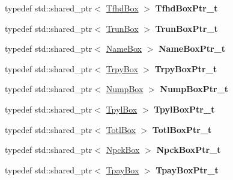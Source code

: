 \begin{DoxyCompactItemize}
typedef std\+::shared\+\_\+ptr$<$ \mbox{\hyperlink{classmp4_parser_1_1_tfhd_box}{Tfhd\+Box}} $>$ {\bfseries Tfhd\+Box\+Ptr\+\_\+t}
\item 
\mbox{\label{namespacemp4_parser_ac970ba7eebced5654f64e1b73e5c2da7}} 
typedef std\+::shared\+\_\+ptr$<$ \mbox{\hyperlink{classmp4_parser_1_1_trun_box}{Trun\+Box}} $>$ {\bfseries Trun\+Box\+Ptr\+\_\+t}
\item 
\mbox{\label{namespacemp4_parser_ab5c488fa3b02c086a34fd59710661f1c}} 
typedef std\+::shared\+\_\+ptr$<$ \mbox{\hyperlink{classmp4_parser_1_1_name_box}{Name\+Box}} $>$ {\bfseries Name\+Box\+Ptr\+\_\+t}
\item 
\mbox{\label{namespacemp4_parser_a4f55dbfb3a7dca7b1593637979e08aea}} 
typedef std\+::shared\+\_\+ptr$<$ \mbox{\hyperlink{classmp4_parser_1_1_trpy_box}{Trpy\+Box}} $>$ {\bfseries Trpy\+Box\+Ptr\+\_\+t}
\item 
\mbox{\label{namespacemp4_parser_ae38e8b576ad12ada8b415eebd74f6580}} 
typedef std\+::shared\+\_\+ptr$<$ \mbox{\hyperlink{classmp4_parser_1_1_nump_box}{Nump\+Box}} $>$ {\bfseries Nump\+Box\+Ptr\+\_\+t}
\item 
\mbox{\label{namespacemp4_parser_a7ceeb29b43ac8d19e5dde9fa599ae821}} 
typedef std\+::shared\+\_\+ptr$<$ \mbox{\hyperlink{classmp4_parser_1_1_tpyl_box}{Tpyl\+Box}} $>$ {\bfseries Tpyl\+Box\+Ptr\+\_\+t}
\item 
\mbox{\label{namespacemp4_parser_a12490480d6e601622c1b98403a94cc55}} 
typedef std\+::shared\+\_\+ptr$<$ \mbox{\hyperlink{classmp4_parser_1_1_totl_box}{Totl\+Box}} $>$ {\bfseries Totl\+Box\+Ptr\+\_\+t}
\item 
\mbox{\label{namespacemp4_parser_a415c9acfc9e3b5e66fbe9f175400fb2f}} 
typedef std\+::shared\+\_\+ptr$<$ \mbox{\hyperlink{classmp4_parser_1_1_npck_box}{Npck\+Box}} $>$ {\bfseries Npck\+Box\+Ptr\+\_\+t}
\item 
\mbox{\label{namespacemp4_parser_a82361854e7733c85a09174f913d4b5bf}} 
typedef std\+::shared\+\_\+ptr$<$ \mbox{\hyperlink{classmp4_parser_1_1_tpay_box}{Tpay\+Box}} $>$ {\bfseries Tpay\+Box\+Ptr\+\_\+t}

\end{DoxyCompactItemize}
